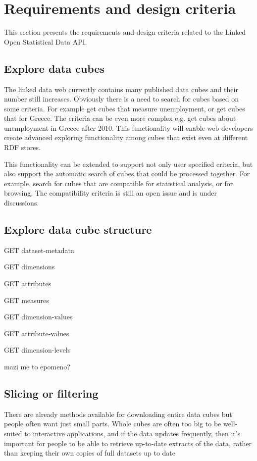 \documentclass{llncs}
\begin{document}
\section{Requirements and design criteria}\label{sec:reqs}

This section presents the requirements and design criteria related to the Linked Open Statistical Data API.

\subsection{Explore data cubes}

The linked data web currently contains many published data cubes and their number still increases. Obviously there is a need to search for cubes based on some criteria. For example get cubes that measure unemployment, or get cubes that for Greece. The criteria can be even more complex e.g. get cubes about unemployment in Greece after 2010. This functionality will enable web developers create advanced exploring functionality among cubes that exist even at different RDF stores.

This functionality can be extended to support not only user specified criteria, but also support the automatic search of cubes that could be processed together. For example, search for cubes that are compatible for statistical analysis, or for browsing. The compatibility criteria is still an open issue and is under discussions.

\subsection{Explore data cube structure}
GET dataset-metadata

GET dimensions

GET attributes

GET measures

GET dimension-values

GET attribute-values

GET dimension-levels

mazi me to epomeno?


\subsection{Slicing or filtering}
There are already methods available for downloading entire data cubes but people often want just small parts.  Whole cubes are often too big to be well-suited to interactive applications, and if the data updates frequently,  then it's important for people to be able to retrieve up-to-date extracts of the data, rather than keeping their own copies of full datasets up to date
\end{document}
